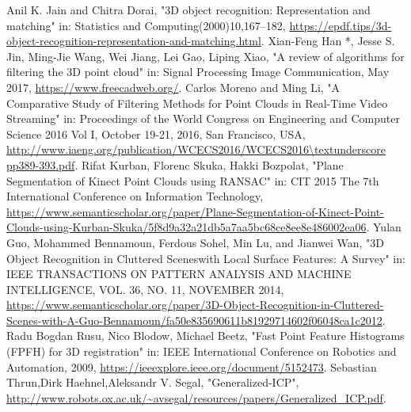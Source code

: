\begin{thebibliography}{1}
		Anil K. Jain and Chitra Dorai,
		"3D object recognition: Representation and matching" in: Statistics and Computing(2000)10,167–182, \url{https://epdf.tips/3d-object-recognition-representation-and-matching.html}.
		Xian-Feng Han *, Jesse S. Jin, Ming-Jie Wang, Wei Jiang, Lei Gao, Liping Xiao,
		"A review of algorithms for filtering the 3D point cloud" in: Signal Processing Image Communication, May 2017, \url{https://www.freecadweb.org/}.
		Carlos Moreno and Ming Li,
		"A Comparative Study of Filtering Methods for Point Clouds in Real-Time Video Streaming" in: Proceedings of the World Congress on Engineering and Computer Science 2016 Vol I, October 19-21, 2016, San Francisco, USA, \url{http://www.iaeng.org/publication/WCECS2016/WCECS2016\textunderscore pp389-393.pdf}.
		Rifat Kurban, Florenc Skuka, Hakki Bozpolat,
		"Plane Segmentation of Kinect Point Clouds using RANSAC" in: CIT 2015 The 7th International Conference on Information Technology, \url{https://www.semanticscholar.org/paper/Plane-Segmentation-of-Kinect-Point-Clouds-using-Kurban-Skuka/5f8d9a32a21db5a7aa5bc68ce8ee8e486002ea06}.
		Yulan Guo, Mohammed Bennamoun, Ferdous Sohel, Min Lu, and Jianwei Wan,
		"3D Object Recognition in Cluttered Sceneswith Local Surface Features: A Survey" in: IEEE TRANSACTIONS ON PATTERN ANALYSIS AND MACHINE INTELLIGENCE,  VOL. 36,  NO. 11,  NOVEMBER 2014, \url{https://www.semanticscholar.org/paper/3D-Object-Recognition-in-Cluttered-Scenes-with-A-Guo-Bennamoun/fa50e835690611b81929714602f06048ca1c2012}.
		Radu Bogdan Rusu, Nico Blodow, Michael Beetz,
		"Fast Point Feature Histograms (FPFH) for 3D registration" in: IEEE International Conference on Robotics and Automation, 2009, \url{https://ieeexplore.ieee.org/document/5152473}.
		Sebastian Thrun,Dirk Haehnel,Aleksandr V. Segal,
		"Generalized-ICP", \url{http://www.robots.ox.ac.uk/~avsegal/resources/papers/Generalized_ICP.pdf}.	
\end{thebibliography}
